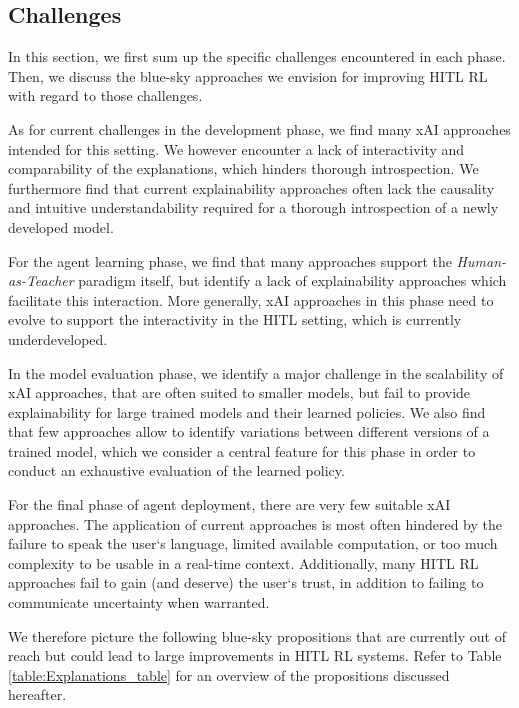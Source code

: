 \documentclass[twoside,11pt]{article}
\begin{document}
\subsection{Challenges}
\label{sec:ThirdGeneration}

In this section, we first sum up the specific challenges encountered in each phase. Then, we discuss the blue-sky approaches we envision for improving HITL RL with regard to those challenges.

As for current challenges in the development phase, we find many xAI approaches intended for this setting. We however encounter a lack of interactivity and comparability of the explanations, which hinders thorough introspection. We furthermore find that current explainability approaches often lack the causality and intuitive understandability required for a thorough introspection of a newly developed model.

For the agent learning phase, we find that many approaches support the \emph{Human-as-Teacher} paradigm itself, but identify a lack of explainability approaches which facilitate this interaction. More generally, xAI approaches in this phase need to evolve to support the interactivity in the HITL setting, which is currently underdeveloped.

In the model evaluation phase, we identify a major challenge in the scalability of xAI approaches, that are often suited to smaller models, but fail to provide explainability for large trained models and their learned policies. We also find that few approaches allow to identify variations between different versions of a trained model, which we consider a central feature for this phase in order to conduct an exhaustive evaluation of the learned policy.

For the final phase of agent deployment, there are very few suitable xAI approaches. The application of current approaches is most often hindered by the failure to speak the user`s language, limited available computation, or too much complexity to be usable in a real-time context. Additionally, many HITL RL approaches fail to gain (and deserve) the user`s trust, in addition to failing to communicate uncertainty when warranted.

We therefore picture the following blue-sky propositions that are currently out of reach but could lead to large improvements in HITL RL systems. Refer to Table \ref{table:Explanations_table} for an overview of the propositions discussed hereafter.

\end{document}
